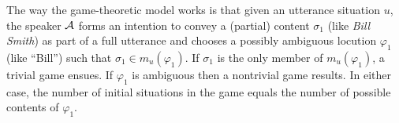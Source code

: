 

The way the game-theoretic model works is that given an utterance situation $u$, the speaker $\cal A$ forms  an intention to convey a (partial) content $\sigma_1$ (like \emph{Bill Smith}) as part of a full utterance and chooses a possibly ambiguous locution $\varphi_1$ (like ``Bill'') such that $\sigma_1 \in m_u(\varphi_1)$. If $\sigma_1$ is the only member of $m_u(\varphi_1)$, a trivial game ensues. If $\varphi_1$ is ambiguous then a nontrivial game results. In either case, the number of initial situations in the game equals the number of possible contents of $\varphi_1$. 




